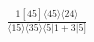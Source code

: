 \documentclass[varwidth, border=5pt]{standalone}
\begin{document}
\begin{my}
$\begin{gathered}
\scriptscriptstyle\frac{1[45]⟨45⟩⟨24⟩}{⟨15⟩⟨35⟩⟨5|1+3|5]}
\end{gathered}$
\end{my}
\end{document}
